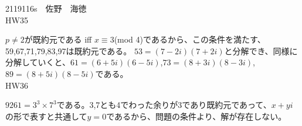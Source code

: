 \documentclass[11pt]{jsarticle}
\begin{document}
2119116s　佐野　海徳\\
HW35
\par $p \neq 2$が既約元である iff $x \equiv 3$(mod 4)であるから、この条件を満たす、59,67,71,79,83,97は既約元である。
$53 = (7 -2i)(7 + 2i)$と分解でき、同様に分解していくと、$61 = (6 + 5i)(6 - 5i)$,$73 = (8 + 3i)(8 - 3i)$,$89 = (8 + 5i)(8 - 5i)$である。\\
HW36
\par $9261 = 3^3 \times 7^3$である。3,7とも4でわった余りが3であり既約元であって、$x + yi$の形で表すと共通して$y = 0$であるから、問題の条件より、解が存在しない。
\end{document}
